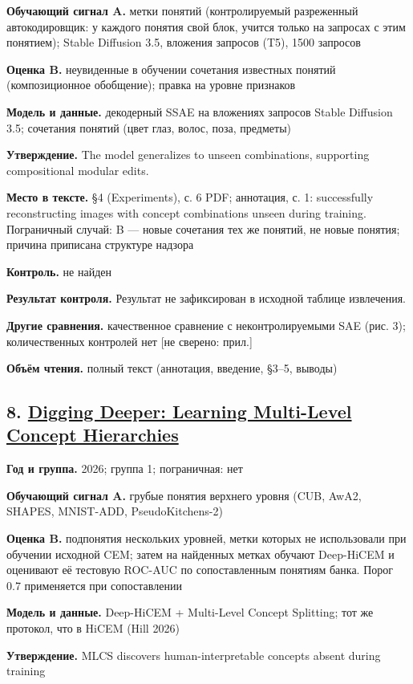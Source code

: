 \textbf{Обучающий сигнал A.} метки понятий (контролируемый разреженный автокодировщик: у каждого понятия свой блок, учится только на запросах с этим понятием); Stable Diffusion 3.5, вложения запросов (T5), 1500 запросов

\textbf{Оценка B.} неувиденные в обучении сочетания известных понятий (композиционное обобщение); правка на уровне признаков

\textbf{Модель и данные.} декодерный SSAE на вложениях запросов Stable Diffusion 3.5; сочетания понятий (цвет глаз, волос, поза, предметы)

\textbf{Утверждение.} The model generalizes to unseen combinations, supporting compositional modular edits.

\textbf{Место в тексте.} §4 (Experiments), с. 6 PDF; аннотация, с. 1: successfully reconstructing images with concept combinations unseen during training. Пограничный случай: B — новые сочетания тех же понятий, не новые понятия; причина приписана структуре надзора

\textbf{Контроль.} не найден

\textbf{Результат контроля.} Результат не зафиксирован в исходной таблице извлечения.

\textbf{Другие сравнения.} качественное сравнение с неконтролируемыми SAE (рис. 3); количественных контролей нет [не сверено: прил.]

\textbf{Объём чтения.} полный текст (аннотация, введение, §3–5, выводы)


\subsection*{8. \href{https://doi.org/10.48550/arxiv.2603.10084}{Digging Deeper: Learning Multi-Level Concept Hierarchies}}

\textbf{Год и группа.} 2026; группа 1; пограничная: нет

\textbf{Обучающий сигнал A.} грубые понятия верхнего уровня (CUB, AwA2, SHAPES, MNIST-ADD, PseudoKitchens-2)

\textbf{Оценка B.} подпонятия нескольких уровней, метки которых не использовали при обучении исходной CEM; затем на найденных метках обучают Deep-HiCEM и оценивают её тестовую ROC-AUC по сопоставленным понятиям банка. Порог 0.7 применяется при сопоставлении

\textbf{Модель и данные.} Deep-HiCEM + Multi-Level Concept Splitting; тот же протокол, что в HiCEM (Hill 2026)

\textbf{Утверждение.} MLCS discovers human-interpretable concepts absent during training

